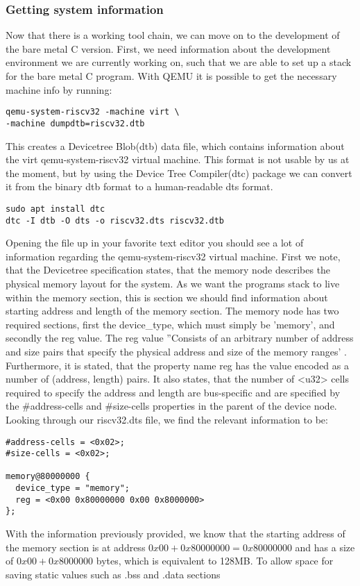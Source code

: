 \subsubsection{Getting system information}\label{sec:sys-info}
Now that there is a working tool chain, we can move on to the development of the
bare metal C version. First, we need information about the development
environment we are currently working on, such that we are able to set up a stack
for the bare metal C program. With QEMU it is possible to get the necessary
machine info by running:
\begin{lstlisting}
qemu-system-riscv32 -machine virt \
-machine dumpdtb=riscv32.dtb
\end{lstlisting}
This creates a Devicetree Blob(dtb) data file, which contains information about
the virt qemu-system-riscv32 virtual machine. This format is not usable by us
at the moment, but by using the Device Tree Compiler(dtc) package we can convert
it from the binary dtb format to a human-readable dts format.
\begin{lstlisting}
sudo apt install dtc
dtc -I dtb -O dts -o riscv32.dts riscv32.dtb
\end{lstlisting}
Opening the file up in your favorite text editor you should see a lot of
information regarding the qemu-system-riscv32 virtual machine. First we note,
that the Devicetree specification states, that the memory node describes the
physical memory layout for the system. As we want the programs stack
to live within the memory section, this is section we should find information
about starting address and length of the memory section. The memory node has
two required sections, first the device\_type, which must simply be 'memory', and
secondly the reg value. The reg value ''Consists of an arbitrary number of
address and size pairs that specify the physical address and size of the memory
ranges' \cite{DTS}. Furthermore, it is stated, that the property name reg has
the value encoded as a number of (address, length) pairs. It also states, that
the number of <u32> cells required to specify the address and length are
bus-specific and are specified by the \#address-cells and \#size-cells properties
in the parent of the device node.
Looking through our riscv32.dts file, we find the relevant information to be:
\begin{lstlisting}
#address-cells = <0x02>;
#size-cells = <0x02>;

memory@80000000 {
  device_type = "memory";
  reg = <0x00 0x80000000 0x00 0x8000000>
};
\end{lstlisting}
With the information previously provided, we know that the starting
address of the memory section is at address $0x00 + 0x80000000 = 0x80000000$ and has a size of
$0x00 + 0x8000000$ bytes, which is equivalent to 128MB. To allow space for saving static values such as .bss and .data sections

